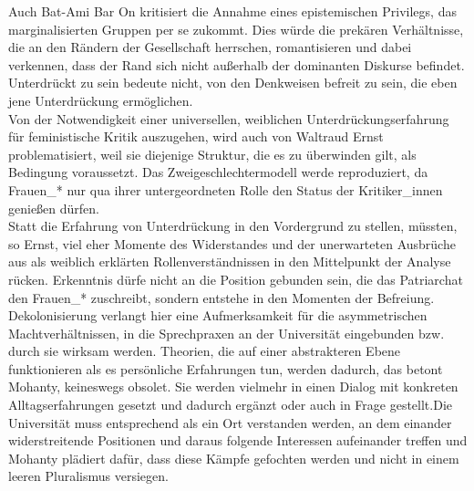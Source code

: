 Auch Bat-Ami Bar On kritisiert die Annahme eines epistemischen Privilegs, das
marginalisierten Gruppen per se zukommt. Dies würde die prekären Verhältnisse,
die an den Rändern der Gesellschaft herrschen, romantisieren und dabei
verkennen, dass der Rand sich nicht außerhalb der dominanten Diskurse befindet.
Unterdrückt zu sein bedeute nicht, von den Denkweisen befreit zu sein, die eben
jene Unterdrückung ermöglichen.\footnotemark {}\\

Von der Notwendigkeit einer universellen, weiblichen Unterdrückungserfahrung
für feministische Kritik auszugehen, wird auch von Waltraud Ernst
problematisiert, weil sie diejenige Struktur, die es zu überwinden gilt, als
Bedingung voraussetzt. Das Zweigeschlechtermodell werde reproduziert, da
Frauen\_* nur qua ihrer untergeordneten Rolle den Status der Kritiker\_innen
genießen dürfen. \\
Statt die Erfahrung von Unterdrückung in den Vordergrund zu
stellen, müssten, so Ernst, viel eher Momente des Widerstandes und der
unerwarteten Ausbrüche aus als weiblich erklärten Rollenverständnissen in den
Mittelpunkt der Analyse rücken. Erkenntnis dürfe nicht an die Position gebunden
sein, die das Patriarchat den Frauen\_* zuschreibt, sondern entstehe in den
Momenten der Befreiung.\footnotemark {}\\

\noindent Dekolonisierung verlangt hier eine
Aufmerksamkeit für die asymmetrischen Machtverhältnissen, in die Sprechpraxen
an der Universität eingebunden bzw. durch sie wirksam werden. Theorien, die auf
einer abstrakteren Ebene funktionieren als es persönliche Erfahrungen tun,
werden dadurch, das betont Mohanty, keineswegs obsolet. Sie werden vielmehr in
einen Dialog mit konkreten Alltagserfahrungen gesetzt und dadurch ergänzt oder
auch in Frage gestellt.\footnotemark {}Die Universität muss entsprechend als ein Ort verstanden
werden, an dem einander widerstreitende Positionen und daraus folgende
Interessen aufeinander treffen und Mohanty plädiert dafür, dass diese Kämpfe
gefochten werden und nicht in einem leeren Pluralismus versiegen.\\


